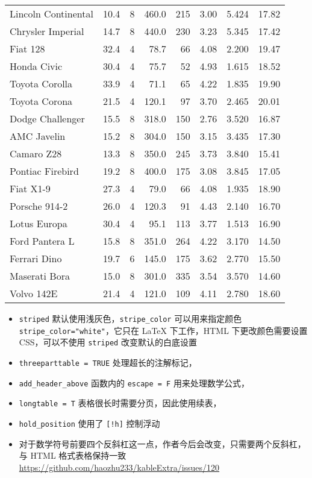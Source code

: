 \documentclass[]{book}
\providecommand{\tightlist}{%
  \setlength{\itemsep}{0pt}\setlength{\parskip}{0pt}}
\begin{document}
\begin{ThreePartTable}
\begin{longtable}[t]{lrrrrrrr}
Lincoln Continental & 10.4 & 8 & 460.0 & 215 & 3.00 & 5.424 & 17.82\\
Chrysler Imperial & 14.7 & 8 & 440.0 & 230 & 3.23 & 5.345 & 17.42\\
Fiat 128 & 32.4 & 4 & 78.7 & 66 & 4.08 & 2.200 & 19.47\\
\midrule
Honda Civic & 30.4 & 4 & 75.7 & 52 & 4.93 & 1.615 & 18.52\\
Toyota Corolla & 33.9 & 4 & 71.1 & 65 & 4.22 & 1.835 & 19.90\\
Toyota Corona & 21.5 & 4 & 120.1 & 97 & 3.70 & 2.465 & 20.01\\
Dodge Challenger & 15.5 & 8 & 318.0 & 150 & 2.76 & 3.520 & 16.87\\
AMC Javelin & 15.2 & 8 & 304.0 & 150 & 3.15 & 3.435 & 17.30\\
Camaro Z28 & 13.3 & 8 & 350.0 & 245 & 3.73 & 3.840 & 15.41\\
\midrule
Pontiac Firebird & 19.2 & 8 & 400.0 & 175 & 3.08 & 3.845 & 17.05\\
Fiat X1-9 & 27.3 & 4 & 79.0 & 66 & 4.08 & 1.935 & 18.90\\
Porsche 914-2 & 26.0 & 4 & 120.3 & 91 & 4.43 & 2.140 & 16.70\\
Lotus Europa & 30.4 & 4 & 95.1 & 113 & 3.77 & 1.513 & 16.90\\
Ford Pantera L & 15.8 & 8 & 351.0 & 264 & 4.22 & 3.170 & 14.50\\
Ferrari Dino & 19.7 & 6 & 145.0 & 175 & 3.62 & 2.770 & 15.50\\
\midrule
Maserati Bora & 15.0 & 8 & 301.0 & 335 & 3.54 & 3.570 & 14.60\\
Volvo 142E & 21.4 & 4 & 121.0 & 109 & 4.11 & 2.780 & 18.60\\*
\end{longtable}
\end{ThreePartTable}

\begin{itemize}
\tightlist
\item
  \texttt{striped} 默认使用浅灰色，\texttt{stripe\_color}
  可以用来指定颜色 \texttt{stripe\_color="white"}，它只在 LaTeX
  下工作，HTML 下更改颜色需要设置 CSS，可以不使用 \texttt{striped}
  改变默认的白底设置\\
\item
  \texttt{threeparttable\ =\ TRUE} 处理超长的注解标记，
\item
  \texttt{add\_header\_above} 函数内的 \texttt{escape\ =\ F}
  用来处理数学公式，
\item
  \texttt{longtable\ =\ T} 表格很长时需要分页，因此使用续表，
\item
  \texttt{hold\_position} 使用了 \texttt{{[}!h{]}} 控制浮动
\item
  对于数学符号前要四个反斜杠这一点，作者今后会改变，只需要两个反斜杠，与
  HTML 格式表格保持一致
  \url{https://github.com/haozhu233/kableExtra/issues/120}
\end{itemize}
\end{document}
